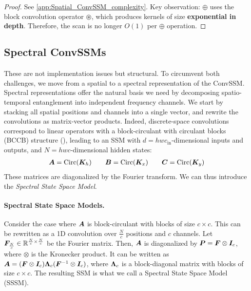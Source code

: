 \documentclass{article}
\newcommand{\TS}[1]{\par\noindent{\color{red}[TS]: #1}\par}
\begin{document}
\begin{proof}
See \cref{app:Spatial_ConvSSM_complexity}. Key observation: $\oplus$ uses the block convolution operator $\circledast$, which produces kernels of size \textbf{exponential in depth}. Therefore, the scan is no longer $O(1)$ per $\oplus$ operation.
\end{proof}


\subsection{Spectral ConvSSMs}

\paragraph{} These are not implementation issues but structural. To circumvent both challenges, we move from a spatial to a spectral representation of the ConvSSM. Spectral representations offer the natural basis we need by decomposing spatio-temporal entanglement into independent frequency channels. We start by stacking all spatial positions and channels into a single vector, and rewrite the convolutions as matrix-vector products.
%
Indeed, discrete-space convolutions correspond to linear operators with a block-circulant with circulant blocks (BCCB) structure (), leading to an SSM with $d = h w c_\mathrm{in}$-dimensional inputs and outputs, and $N = h w c$-dimensional hidden states:
%
\begin{align}
\label{eq:convssm:spatial}
\bm{A} = \mathrm{Circ}(\bm{K}_h) \qquad \bm{B} = \mathrm{Circ}(\bm{K}_x) \qquad \bm{C} = \mathrm{Circ}(\bm{K}_y)
\end{align}
%
These matrices are diagonalized by the Fourier transform. We can thus introduce the \emph{Spectral State Space Model}.

\paragraph{Spectral State Space Models.} Consider the case where $\bm{A}$ is block-circulant with blocks of size $c \!\times\! c$. This can be rewritten as a 1D convolution over $\frac{N}{c}$ positions and $c$ channels. Let $\bm{F}_{\frac{N}{c}} \in \mathbb{R}^{\frac{N}{c} \times \frac{N}{c}}$ be the Fourier matrix. Then, $\bm{A}$ is diagonalized by $\bm{P} = \bm{F} \otimes \bm{I}_c$, where $\otimes$ is the Kronecker product. It can be written as $\bm{A} = (\bm{F} \otimes \bm{I}_c) \bm{\Lambda}_c (\bm{F}^{-1} \otimes \bm{I}_c)$, where $\bm{\Lambda}_c$ is a block-diagonal matrix with blocks of size $c \!\times\! c$. The resulting SSM is what we call a Spectral State Space Model (SSSM).
\end{document}
